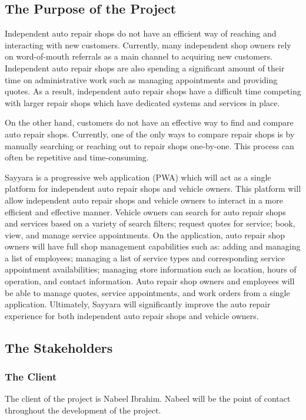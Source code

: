 \documentclass[12pt]{article}
\begin{document}
\subsection{The Purpose of the Project}

Independent auto repair shops do not have an efficient way of reaching and interacting with new
customers. Currently, many independent shop owners rely on word-of-mouth referrals as a main
channel to acquiring new customers. Independent auto repair shops are also spending a significant
amount of their time on administrative work such as managing appointments and providing quotes. As
a result, independent auto repair shops have a difficult time competing with larger repair shops
which have dedicated systems and services in place.

On the other hand, customers do not have an effective way to find and compare auto repair shops.
Currently, one of the only ways to compare repair shops is by manually searching or reaching out to
repair shops one-by-one. This process can often be repetitive and time-consuming.

Sayyara is a progressive web application (PWA) which will act as a single platform for independent
auto repair shops and vehicle owners. This platform will allow independent auto repair shops and
vehicle owners to interact in a more efficient and effective manner. Vehicle owners can search for
auto repair shops and services based on a variety of search filters; request quotes for service;
book, view, and manage service appointments. On the application, auto repair shop owners will have
full shop management capabilities such as: adding and managing a list of employees; managing a list
of service types and corresponding service appointment availabilities; managing store information
such as location, hours of operation, and contact information. Auto repair shop owners and
employees will be able to manage quotes, service appointments, and work orders from a single
application. Ultimately, Sayyara will significantly improve the auto repair experience for both
independent auto repair shops and vehicle owners.

\subsection{The Stakeholders}

\subsubsection{The Client}
The client of the project is Nabeel Ibrahim. Nabeel will be the point of contact throughout the
development of the project.
\end{document}
